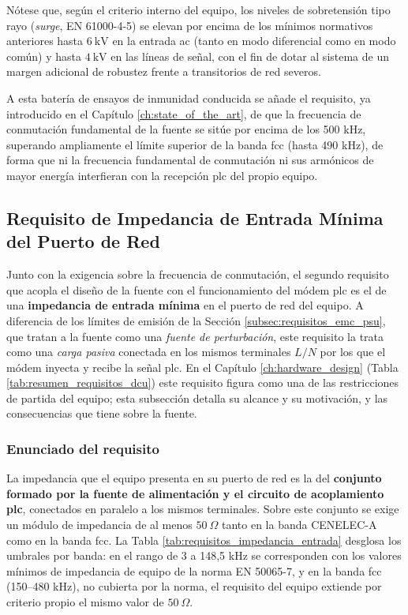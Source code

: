 Nótese que, según el criterio interno del equipo, los niveles de sobretensión tipo rayo (\textit{surge}, EN 61000-4-5) se elevan por encima de los mínimos normativos anteriores hasta $6\ \text{kV}$ en la entrada \gls{ac} (tanto en modo diferencial como en modo común) y hasta $4\ \text{kV}$ en las líneas de señal, con el fin de dotar al sistema de un margen adicional de robustez frente a transitorios de red severos.

A esta batería de ensayos de inmunidad conducida se añade el requisito, ya introducido en el Capítulo \ref{ch:state_of_the_art}, de que la frecuencia de conmutación fundamental de la fuente se sitúe por encima de los 500 kHz, superando ampliamente el límite superior de la banda \gls{fcc} (hasta 490 kHz), de forma que ni la frecuencia fundamental de conmutación ni sus armónicos de mayor energía interfieran con la recepción \gls{plc} del propio equipo.

\subsection{Requisito de Impedancia de Entrada Mínima del Puerto de Red}
\label{subsec:requisito_impedancia_entrada_psu}

Junto con la exigencia sobre la frecuencia de conmutación, el segundo requisito que acopla el diseño de la fuente con el funcionamiento del módem \gls{plc} es el de una \textbf{impedancia de entrada mínima} en el puerto de red del equipo. A diferencia de los límites de emisión de la Sección \ref{subsec:requisitos_emc_psu}, que tratan a la fuente como una \textit{fuente de perturbación}, este requisito la trata como una \textit{carga pasiva} conectada en los mismos terminales $L/N$ por los que el módem inyecta y recibe la señal \gls{plc}. En el Capítulo \ref{ch:hardware_design} (Tabla \ref{tab:resumen_requisitos_dcu}) este requisito figura como una de las restricciones de partida del equipo; esta subsección detalla su alcance y su motivación, y las consecuencias que tiene sobre la fuente.

\subsubsection*{Enunciado del requisito}

La impedancia que el equipo presenta en su puerto de red es la del \textbf{conjunto formado por la fuente de alimentación y el circuito de acoplamiento \gls{plc}}, conectados en paralelo a los mismos terminales. Sobre este conjunto se exige un módulo de impedancia de al menos $50\ \Omega$ tanto en la banda CENELEC-A como en la banda \gls{fcc}. La Tabla \ref{tab:requisitos_impedancia_entrada} desglosa los umbrales por banda: en el rango de 3 a 148,5 kHz se corresponden con los valores mínimos de impedancia de equipo de la norma EN 50065-7, y en la banda \gls{fcc} (150--480 kHz), no cubierta por la norma, el requisito del equipo extiende por criterio propio el mismo valor de $50\ \Omega$.


